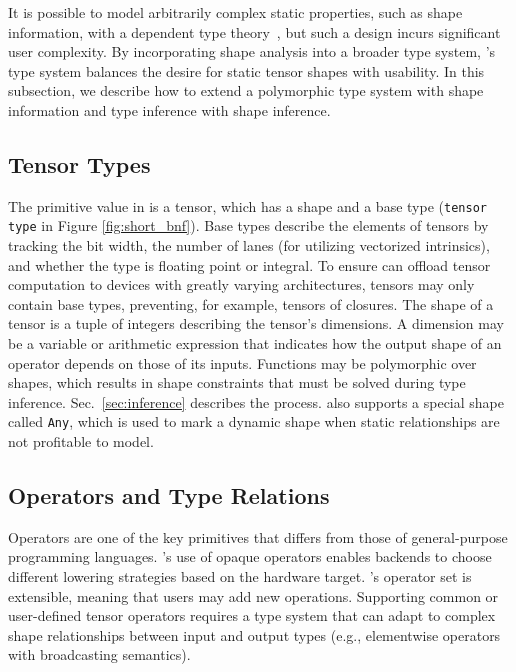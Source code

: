 It is possible to model arbitrarily complex static properties, such
  as shape information, with a dependent type theory~\citep{selsam_certigrad}, but such
  a design incurs significant user complexity.
By incorporating shape analysis into a broader type system,
  \relay's type system balances the desire for static tensor shapes
  with usability.
In this subsection, we describe how to extend a polymorphic type system with shape
  information and type inference with shape inference.

\subsection*{Tensor Types}

The primitive value in \relay is a tensor, which has
  a shape and a base type (\verb|tensor type| in Figure \ref{fig:short_bnf}).
Base types describe the elements of tensors by tracking
  the bit width,
  the number of lanes (for utilizing vectorized intrinsics),
  and whether the type is floating point or integral.
To ensure \relay can offload tensor computation to devices
  with greatly varying architectures,
  \relay tensors may only contain base types,
  preventing, for example, tensors of closures.
The shape of a tensor is a tuple of integers describing the tensor's dimensions.
A dimension may be a variable or arithmetic expression that indicates how the
  output shape of an operator depends on those of its inputs.
Functions may be polymorphic over shapes, which results
  in shape constraints that must be solved during type inference.
Sec.~\ref{sec:inference} describes the process.
\relay also supports a special shape called \verb|Any|, which is used
  to mark a dynamic shape when static relationships are not profitable
  to model.

\subsection*{Operators and Type Relations}
Operators are one of the key primitives that differs from those of
  general-purpose programming languages.
\relay's use of opaque operators enables backends to choose different
  lowering strategies based on the hardware target.
\relay's operator set is extensible, meaning that users may add new operations.
Supporting common or user-defined tensor operators requires a type system that can
  adapt to complex shape relationships between input and output types
  (e.g., elementwise operators with broadcasting semantics).

